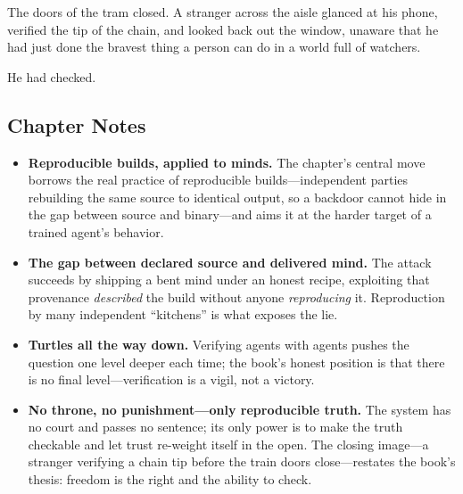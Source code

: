 The doors of the tram closed. A stranger across the aisle glanced at his phone,
verified the tip of the chain, and looked back out the window, unaware that he had
just done the bravest thing a person can do in a world full of watchers.

He had checked.

\hypertarget{chapter-10-notes}{%
\subsection{Chapter Notes}\label{chapter-10-notes}}

\begin{itemize}
\tightlist
\item
  \textbf{Reproducible builds, applied to minds.} The chapter's central move
  borrows the real practice of reproducible builds---independent parties
  rebuilding the same source to identical output, so a backdoor cannot hide in
  the gap between source and binary---and aims it at the harder target of a
  trained agent's behavior.
\item
  \textbf{The gap between declared source and delivered mind.} The attack
  succeeds by shipping a bent mind under an honest recipe, exploiting that
  provenance \emph{described} the build without anyone \emph{reproducing} it.
  Reproduction by many independent ``kitchens'' is what exposes the lie.
\item
  \textbf{Turtles all the way down.} Verifying agents with agents pushes the
  question one level deeper each time; the book's honest position is that there is
  no final level---verification is a vigil, not a victory.
\item
  \textbf{No throne, no punishment---only reproducible truth.} The system has no
  court and passes no sentence; its only power is to make the truth checkable and
  let trust re-weight itself in the open. The closing image---a stranger
  verifying a chain tip before the train doors close---restates the book's thesis:
  freedom is the right and the ability to check.
\end{itemize}
